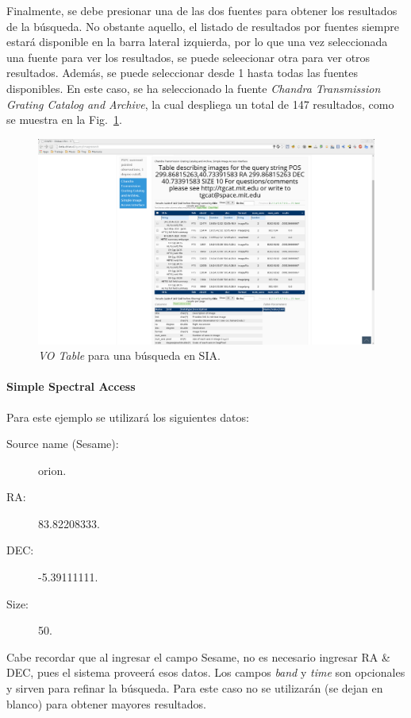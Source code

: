 Finalmente, se debe presionar una de las dos fuentes para obtener los
resultados de la búsqueda. No obstante aquello, el listado de
resultados por fuentes siempre estará disponible en la barra lateral
izquierda, por lo que una vez seleccionada una fuente para ver los
resultados, se puede seleecionar otra para ver otros resultados.
Además, se puede seleccionar desde 1 hasta todas las fuentes
disponibles. En este caso, se ha seleccionado la fuente
\emph{Chandra Transmission Grating Catalog and Archive}, la cual
despliega un total de 147 resultados, como se muestra en la
Fig.~\ref{img:qrsiavot}.

\begin{figure}[ht!]
    \begin{center}
	\includegraphics[scale=.2]{img/qrsiavot}
    \end{center}
    \caption{\emph{VO Table} para una búsqueda en SIA.}
    \label{img:qrsiavot}
\end{figure}


\paragraph{Simple Spectral Access}

Para este ejemplo se utilizará los siguientes datos:

\begin{description}
  \item [Source name (Sesame):] orion.
  \item [RA:] 83.82208333.
  \item [DEC:] -5.39111111.
  \item [Size:] 50.
\end{description}

Cabe recordar que al ingresar el campo Sesame, no es necesario
ingresar RA \& DEC, pues el sistema proveerá esos datos. Los campos
\emph{band} y \emph{time} son opcionales y sirven para refinar la
búsqueda. Para este caso no se utilizarán (se dejan en blanco) para
obtener mayores resultados.

